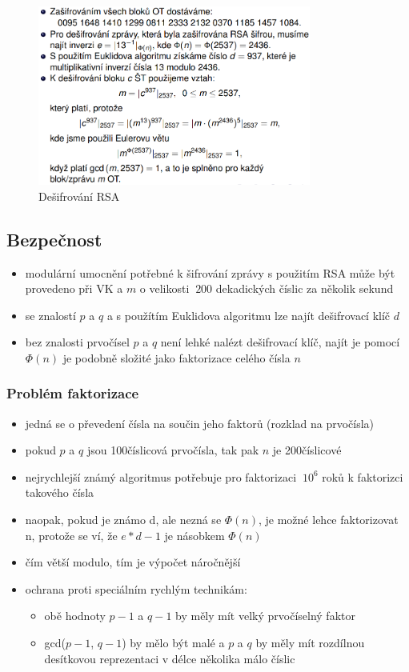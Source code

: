 \documentclass{szzclass}
\begin{document}
\begin{figure}[h!]
    \centering
    \includegraphics[width=0.8\textwidth]{topics/bi-spol-06/image/rsaDecrypt.png}
    \caption{Dešifrování RSA}
\end{figure}
\subsection{Bezpečnost}
\begin{itemize}
    \item modulární umocnění potřebné k šifrování zprávy s použitím RSA může být provedeno při VK a $m$ o velikosti $~200$ dekadických číslic za několik sekund
    \item se znalostí $p$ a $q$ a s použítím Euklidova algoritmu lze najít dešifrovací klíč $d$
    \item bez znalosti prvočísel $p$ a $q$ není lehké nalézt dešifrovací klíč, najít je pomocí $\Phi(n)$ je podobně složité jako faktorizace celého čísla $n$
\end{itemize}
\subsubsection{Problém faktorizace}
\begin{itemize}
    \item jedná se o převedení čísla na součin jeho faktorů (rozklad na prvočísla)
    \item pokud $p$ a $q$ jsou 100číslicová prvočísla, tak pak $n$ je 200číslicové
    \item nejrychlejší známý algoritmus potřebuje pro faktorizaci $~10^6$ roků k faktorizci takového čísla
    \item naopak, pokud je známo d, ale nezná se $\Phi(n)$, je možné lehce faktorizovat n, protože se ví, že $e*d - 1$ je násobkem $\Phi(n)$
    \item čím větší modulo, tím je výpočet náročnější
    \item ochrana proti speciálním rychlým technikám:
    \begin{itemize}
        \item obě hodnoty $p-1$ a $q-1$ by měly mít velký prvočíselný faktor
        \item gcd($p-1$, $q-1$) by mělo být malé a $p$ a $q$ by měly mít rozdílnou desítkovou reprezentaci v délce několika málo číslic
    \end{itemize}
\end{itemize}
\end{document}
